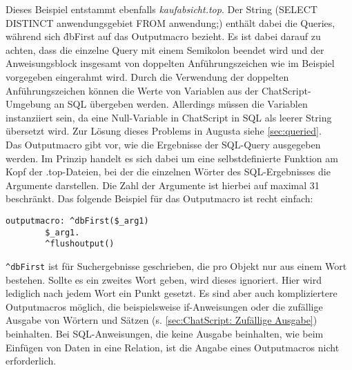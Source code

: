 Dieses Beispiel entstammt ebenfalls \textit{kaufabsicht.top}. Der String (SELECT DISTINCT anwendungsgebiet FROM anwendung;) enthält dabei die Queries, während sich \^dbFirst auf das Outputmacro bezieht. Es ist dabei darauf zu achten, dass die einzelne Query mit einem Semikolon beendet wird und der Anweisungsblock insgesamt von doppelten Anführungszeichen wie im Beispiel vorgegeben eingerahmt wird. Durch die Verwendung der doppelten Anführungszeichen können die Werte von Variablen aus der ChatScript-Umgebung an SQL übergeben werden. Allerdings müssen die Variablen instanziiert sein, da eine Null-Variable in ChatScript in SQL als leerer String übersetzt wird. Zur Lösung dieses Problems in Augusta siehe \ref{sec:queried}.\\
Das Outputmacro gibt vor, wie die Ergebnisse der SQL-Query ausgegeben werden. Im Prinzip handelt es sich dabei um eine selbstdefinierte Funktion am Kopf der .top-Dateien, bei der die einzelnen Wörter des SQL-Ergebnisses die Argumente darstellen. Die Zahl der Argumente ist hierbei auf maximal 31 beschränkt. Das folgende Beispiel für das Outputmacro ist recht einfach:

\begin{lstlisting}[caption={Beispiel für ein Outputmacro}]
outputmacro: ^dbFirst($_arg1)
	    $_arg1.
	    ^flushoutput()
\end{lstlisting}

\lstinline|^dbFirst| ist für Suchergebnisse geschrieben, die pro Objekt nur aus einem Wort bestehen. Sollte es ein zweites Wort geben, wird dieses ignoriert. Hier wird lediglich nach jedem Wort ein Punkt gesetzt. Es sind aber auch kompliziertere Outputmacros möglich, die beispielsweise if-Anweisungen oder die zufällige Ausgabe von Wörtern und Sätzen (s. \ref{sec:ChatScript: Zufällige Ausgabe}) beinhalten. Bei SQL-Anweisungen, die keine Ausgabe beinhalten, wie beim Einfügen von Daten in eine Relation, ist die Angabe eines Outputmacros nicht erforderlich.\\

